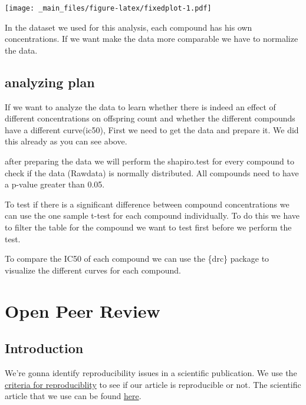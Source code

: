 \documentclass[
]{book}
\begin{document}
\texttt{[image: \_main\_files/figure-latex/fixedplot-1.pdf]}

In the dataset we used for this analysis, each compound has his own concentrations. If we want make the data more comparable we have to normalize the data.

\hypertarget{analyzing-plan}{%
\section{analyzing plan}\label{analyzing-plan}}

If we want to analyze the data to learn whether there is indeed an effect of different concentrations on offspring count and whether the different compounds have a different curve(ic50), First we need to get the data and prepare it. We did this already as you can see above.

after preparing the data we will perform the shapiro.test for every compound to check if the data (Rawdata) is normally distributed. All compounds need to have a p-value greater than 0.05.

To test if there is a significant difference between compound concentrations we can use the one sample t-test for each compound individually. To do this we have to filter the table for the compound we want to test first before we perform the test.

To compare the IC50 of each compound we can use the
\{drc\} package to visualize the different curves for each compound.

\hypertarget{open-peer-review}{%
\chapter{Open Peer Review}\label{open-peer-review}}

\hypertarget{introduction-2}{%
\section{Introduction}\label{introduction-2}}

We're gonna identify reproducibility issues in a scientific publication. We use the \href{https://www.researchgate.net/publication/340244621_Reproducibility_and_reporting_practices_in_COVID-19_preprint_manuscripts}{criteria for reproduciblity} to see if our article is reproducible or not. The scientific article that we use can be found \href{https://www.ncbi.nlm.nih.gov/pmc/articles/PMC4173157/}{here}.
\end{document}
